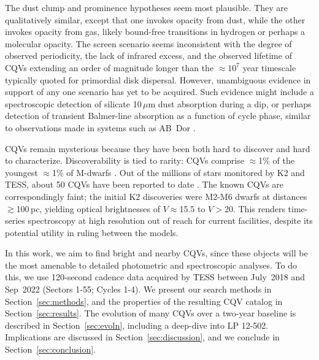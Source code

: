 \documentclass[11pt,twocolumn,tighten]{aastex63}
\begin{document}
The dust clump and prominence hypotheses seem most plausible.  They
are qualitatively similar, except that one invokes opacity from dust,
while the other invokes opacity from gas, likely bound-free
transitions in hydrogen or perhaps a molecular opacity.  The screen
scenario seems inconsistent with the degree of observed periodicity,
the lack of infrared excess, and the observed lifetime of CQVs
extending an order of magnitude longer than the $\approx$$10^7$ year
timescale typically quoted for primordial disk dispersal.
However, unambiguous evidence in support of any one scenario has yet
to be acquired.  Such evidence might include a spectroscopic detection
of silicate 10\,$\mu$m dust absorption during a dip, or perhaps
detection of transient Balmer-line absorption as a function of cycle
phase, similar to observations made in systems such as AB~Dor
\citep[see the review by][]{1999ASPC..158..146C}.

CQVs remain mysterious because they have been both hard to discover
and hard to characterize.   Discoverability is tied to rarity: CQVs
comprise $\approx$1\% of the youngest $\approx$1\% of M-dwarfs
\citep{2018AJ....155..196R}.  Out of the millions of stars monitored
by K2 and TESS, about 50 CQVs have been reported to date
\citep{2016AJ....152..114R,2017AJ....153..152S,2018AJ....155...63S,2019ApJ...876..127Z,2020AJ....160...86B,2022AJ....163..144G,2023ApJ...945..114P}.
The known CQVs are correspondingly faint; the initial K2 discoveries
\citep{2016AJ....152..114R,2017AJ....153..152S} were M2-M6 dwarfs at
distances $\gtrsim$100\,pc, yielding optical brightnesses of
$V$$\approx$15.5 to $V$$>$20.  This renders time-series spectroscopy
at high resolution out of reach for current facilities, despite its
potential utility in ruling between the models.

In this work, we aim to find bright and nearby CQVs, since these
objects will be the most amenable to detailed photometric and
spectroscopic analyses.  To do this, we use 120-second cadence data
acquired by TESS between July~2018 and Sep~2022 (Sectors 1-55; Cycles
1-4).  We present our search methods in Section~\ref{sec:methods}, and
the properties of the resulting CQV catalog in
Section~\ref{sec:results}.  The evolution of many CQVs over a two-year
baseline is described in Section~\ref{sec:evoln}, including a
deep-dive into LP 12-502.  Implications are discussed in
Section~\ref{sec:discussion}, and we conclude in
Section~\ref{sec:conclusion}.
\end{document}
